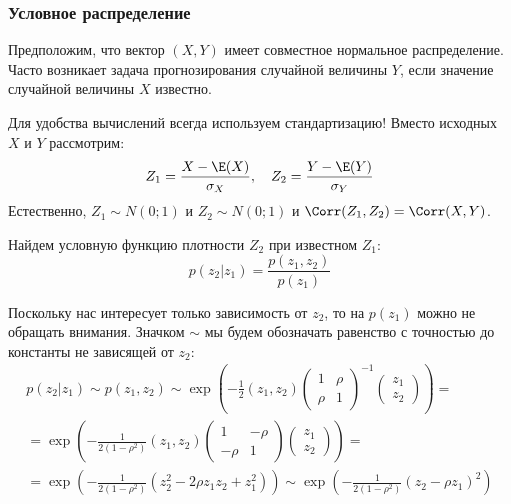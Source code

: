 \subsubsection*{Условное распределение}

Предположим, что вектор $(X,Y)$ имеет совместное нормальное распределение. Часто возникает задача прогнозирования случайной величины $Y$, если значение случайной величины $X$ известно.


Для удобства вычислений всегда используем стандартизацию! Вместо исходных $X$ и $Y$ рассмотрим:
\begin{equation}
Z_{1}=\frac{X-\E(X)}{\sigma_{X}}, \quad Z_{2}=\frac{Y-\E(Y)}{\sigma_{Y}}
\end{equation}
Естественно, $Z_{1}\sim N(0;1)$ и $Z_{2}\sim N(0;1)$ и $\Corr(Z_{1},Z_{2})=\Corr(X,Y)$.

Найдем условную функцию плотности $Z_{2}$ при известном $Z_{1}$:
\begin{equation}
p(z_{2}|z_{1})=\frac{p(z_{1},z_{2})}{p(z_{1})}
\end{equation}

Поскольку нас интересует только зависимость от $z_{2}$, то на $p(z_{1})$ можно не обращать внимания. Значком $\sim$ мы будем обозначать равенство с точностью до константы не зависящей от $z_{2}$:
\begin{multline}
p(z_{2}|z_{1})\sim p(z_{1},z_{2})\sim \exp\left(-\frac{1}{2}(z_{1},z_{2})\left(\begin{matrix}
1 & \rho \\ 
\rho & 1
\end{matrix}\right)^{-1}\left( \begin{matrix}
z_{1} \\ 
z_{2}
\end{matrix}\right)   \right)=\\
=\exp\left(-\frac{1}{2(1-\rho^{2})}(z_{1},z_{2})\left(\begin{matrix}
1 & -\rho \\ 
-\rho & 1
\end{matrix}\right)\left( \begin{matrix}
z_{1} \\ 
z_{2}
\end{matrix}\right)   \right)= \\
=\exp\left(-\frac{1}{2(1-\rho^{2})}\left(z_{2}^{2}-2\rho z_{1}z_{2}+z_{1}^{2}\right) \right)\sim 
\exp\left(-\frac{1}{2(1-\rho^{2})}\left(z_{2}-\rho z_{1}\right)^{2}\right)
\end{multline}

